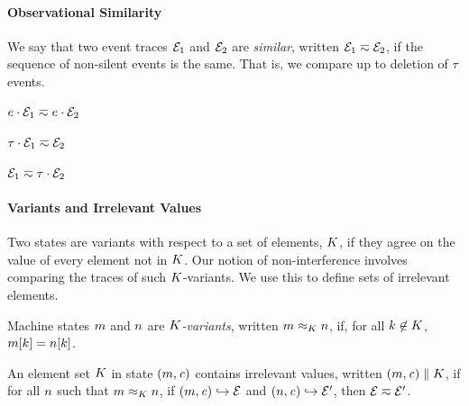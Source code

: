 \documentclass[10pt,conference]{ieeetran}%
\theoremstyle{definition}
\begin{document}
\paragraph*{Observational Similarity}

We say that two event traces $\mathcal{E}_1$ and $\mathcal{E}_2$ are {\em similar},
written \(\mathcal{E}_1 \eqsim \mathcal{E}_2\), if the sequence of non-silent events
is the same. That is, we compare up to deletion of \(\tau\) events.

\begin{minipage}{.4\columnwidth}
  \judgment{}{\(\obsT \eqsim \obsT\)}
\end{minipage}
\begin{minipage}{.4\columnwidth}
           {\(e \cdot \mathcal{E}_1 \eqsim e \cdot \mathcal{E}_2\)}
\end{minipage}

\begin{minipage}{.4\columnwidth}
           {\(\tau \cdot \mathcal{E}_1 \eqsim \mathcal{E}_2\)}
\end{minipage}
\begin{minipage}{.4\columnwidth}
           {\(\mathcal{E}_1 \eqsim \tau \cdot \mathcal{E}_2\)}
\end{minipage}

\paragraph*{Variants and Irrelevant Values}

Two states are variants with respect to a set of elements, \(K\),
if they agree on the value of every element not in \(K\). Our
notion of non-interference involves comparing the traces of such
\(K\)-variants. We use this to define sets of irrelevant elements.

 Machine states \(m\) and \(n\) are {\em \(K\)-variants},
written \(m \approx_K n\), if, for
all \(k \not \in K\), \(m[k] = n[k]\).

 An element set \(K\) in state \((m,\mathit{c})\) contains
irrelevant values, written \((m,\mathit{c}) \parallel K\), if for all
\(n\) such that \(m \approx_{K} n\), if 
\((m,\mathit{c}) \hookrightarrow \mathcal{E}\) and
\((n,\mathit{c}) \hookrightarrow \mathcal{E}'\), then
\(\mathcal{E} \eqsim \mathcal{E}'\).
\end{document}
